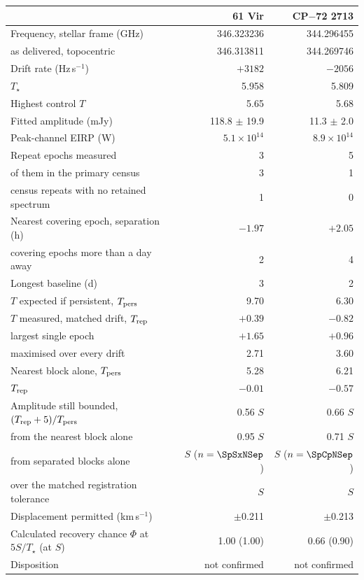 \begin{tabular}{@{}>{\raggedright\arraybackslash}p{}@{~~}r@{~~}r@{}}
\hline
 & 61 Vir & CP$-$72 2713 \\
\hline
Frequency, stellar frame (GHz) & 346.323236 & 344.296455 \\
\quad as delivered, topocentric & 346.313811 & 344.269746 \\
Drift rate (Hz\,s$^{-1}$) & $+3182$ & $-2056$ \\
$T_\star$ & 5.958 & 5.809 \\
Highest control $T$ & 5.65 & 5.68 \\
Fitted amplitude (mJy) & 118.8 $\pm$ 19.9 & 11.3 $\pm$ 2.0 \\
Peak-channel EIRP (W) & $5.1 \times 10^{14}$ & $8.9 \times 10^{14}$ \\
Repeat epochs measured & 3 & 5 \\
\quad of them in the primary census & 3 & 1 \\
\quad census repeats with no retained spectrum & 1 & 0 \\
Nearest covering epoch, separation (h) & $-1.97$ & $+2.05$ \\
\quad covering epochs more than a day away & 2 & 4 \\
Longest baseline (d) & 3 & 2 \\
$T$ expected if persistent, $T_{\rm pers}$ & 9.70 & 6.30 \\
$T$ measured, matched drift, $T_{\rm rep}$ & $+0.39$ & $-0.82$ \\
\quad largest single epoch & $+1.65$ & $+0.96$ \\
\quad maximised over every drift & 2.71 & 3.60 \\
Nearest block alone, $T_{\rm pers}$ & 5.28 & 6.21 \\
\quad $T_{\rm rep}$ & $-0.01$ & $-0.57$ \\
Amplitude still bounded, $(T_{\rm rep}+5)/T_{\rm pers}$ & 0.56 $S$ & 0.66 $S$ \\
\quad from the nearest block alone & 0.95 $S$ & 0.71 $S$ \\
\quad from separated blocks alone & \SpSxFracSep{} $S$ ($n=\SpSxNSep$) & \SpCpFracSep{} $S$ ($n=\SpCpNSep$) \\
\quad over the matched registration tolerance & \SpSxFracTol{} $S$ & \SpCpFracTol{} $S$ \\
Displacement permitted (km\,s$^{-1}$) & $\pm$0.211 & $\pm$0.213 \\
Calculated recovery chance $\Phi$ at $5S/T_\star$ (at $S$) & 1.00 (1.00) & 0.66 (0.90) \\
Disposition & not confirmed & not confirmed \\
\hline
\end{tabular}
